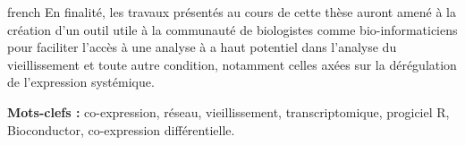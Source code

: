 \begin{otherlanguage*}{french}
En finalité, les travaux présentés au cours de cette thèse auront amené à la création d'un outil utile à la communauté de biologistes comme bio-informaticiens pour faciliter l'accès à une analyse à a haut potentiel dans l'analyse du vieillissement et toute autre condition, notamment celles axées sur la dérégulation de l'expression systémique.

\textbf{Mots-clefs :} co-expression, réseau, vieillissement, transcriptomique, progiciel R, Bioconductor, co-expression différentielle.
\end{otherlanguage*}
